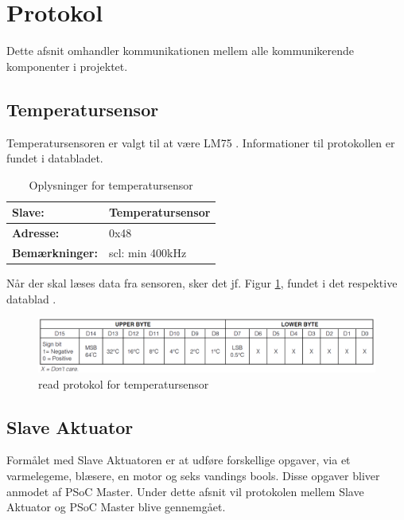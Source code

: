 \section{\IIC Protokol} \label{sec:I2C_protokol}
Dette afsnit omhandler kommunikationen mellem alle \IIC kommunikerende komponenter i projektet.

\subsection{Temperatursensor}
Temperatursensoren er valgt til at være LM75 \cite{lib:LM75}. Informationer til protokollen er fundet i databladet.

\begin{table}[h]
\centering
\begin{tabularx}{0.6\textwidth}{| X | X |} 			\hline
\textbf{Slave:} 		& Temperatursensor			\\ \hline
\textbf{Adresse:}		& 0x48						\\ \hline
\textbf{Bemærkninger:}	& scl: min 400kHz			\\ \hline
\end{tabularx}
\caption{\IIC Oplysninger for temperatursensor}
\label{tbl:I2CTempLuftOplysninger}
\end{table}

Når der skal læses data fra sensoren, sker det jf. Figur \ref{fig:I2CTempProtokol}, fundet i det respektive datablad \cite{lib:LM75}.

\begin{figure}[h]
\centering
\includegraphics[width=\textwidth - 1 cm]{../fig/LM75Bitsekvens.png}
\caption{\IIC read protokol for temperatursensor}
\label{fig:I2CTempProtokol}
\end{figure}

\clearpage

\subsection{Slave Aktuator}
Formålet med Slave Aktuatoren er at udføre forskellige opgaver, via et varmelegeme, blæsere, en motor og seks vandings bools. Disse opgaver bliver anmodet af PSoC Master. Under dette afsnit vil protokolen mellem Slave Aktuator og PSoC Master blive gennemgået.

